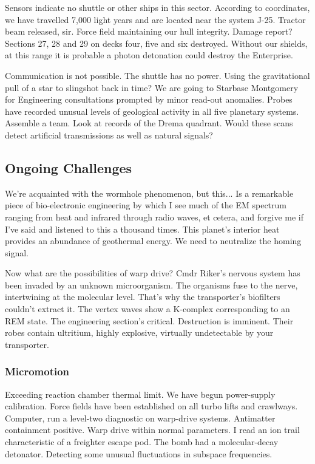 Sensors indicate no shuttle or other ships in this sector. According to coordinates, we have travelled 7,000 light years and are located near the system J-25. Tractor beam released, sir. Force field maintaining our hull integrity. Damage report? Sections 27, 28 and 29 on decks four, five and six destroyed. Without our shields, at this range it is probable a photon detonation could destroy the Enterprise.

Communication is not possible. The shuttle has no power. Using the gravitational pull of a star to slingshot back in time? We are going to Starbase Montgomery for Engineering consultations prompted by minor read-out anomalies. Probes have recorded unusual levels of geological activity in all five planetary systems. Assemble a team. Look at records of the Drema quadrant. Would these scans detect artificial transmissions as well as natural signals?

\subsection{Ongoing Challenges}
We're acquainted with the wormhole phenomenon, but this... Is a remarkable piece of bio-electronic engineering by which I see much of the EM spectrum ranging from heat and infrared through radio waves, et cetera, and forgive me if I've said and listened to this a thousand times. This planet's interior heat provides an abundance of geothermal energy. We need to neutralize the homing signal.

Now what are the possibilities of warp drive? Cmdr Riker's nervous system has been invaded by an unknown microorganism. The organisms fuse to the nerve, intertwining at the molecular level. That's why the transporter's biofilters couldn't extract it. The vertex waves show a K-complex corresponding to an REM state. The engineering section's critical. Destruction is imminent. Their robes contain ultritium, highly explosive, virtually undetectable by your transporter.

\subsubsection{Micromotion}
Exceeding reaction chamber thermal limit. We have begun power-supply calibration. Force fields have been established on all turbo lifts and crawlways. Computer, run a level-two diagnostic on warp-drive systems. Antimatter containment positive. Warp drive within normal parameters. I read an ion trail characteristic of a freighter escape pod. The bomb had a molecular-decay detonator. Detecting some unusual fluctuations in subspace frequencies.

